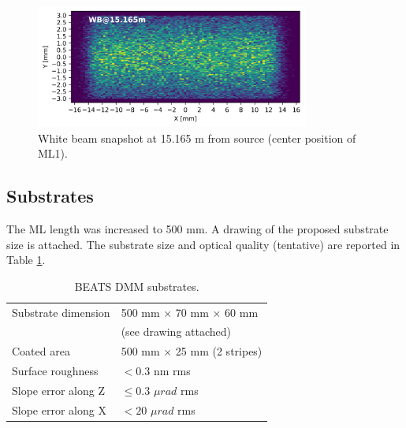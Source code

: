 \setlength{\belowcaptionskip}{-15pt}
\vspace*{-\baselineskip}

\begin{figure} [!ht]
\centering
\includegraphics[width=0.8\textwidth]{./../../beam_snapshots/WB_snapshot_15.165.png}
\caption{\label{fig:snapshot_ML1} White beam snapshot at 15.165 m from source (center position of ML1).}
\end{figure}
\setlength{\belowcaptionskip}{-15pt}

\clearpage
\subsection{Substrates}
The ML length was increased to 500 mm. A drawing of the proposed substrate size is attached. The substrate size and optical quality (tentative) are reported in Table \ref{tab:substrates}.

\begin{center}
\begin{table} [ht]
\begin{tabular}[bhp]{|p{} | p{}|}
\hline
Substrate dimension & 500 mm × 70 mm × 60 mm \\
 & (see drawing attached) \\
\hline
Coated area & 500 mm × 25 mm (2 stripes) \\
\hline
Surface roughness & $< 0.3$ nm rms \\
\hline
Slope error along Z & $\leq 0.3$ $\mu rad$ rms \\
\hline
Slope error along X & $< 20$ $\mu rad$ rms \\
\hline
\end{tabular}
\caption{\label{tab:substrates} BEATS DMM substrates.}
\end{table}
\end{center}

